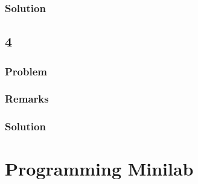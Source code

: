 \documentclass[12pt,twoside]{article}
\begin{document}
\subsubsection*{Solution}

\subsection{4}
\subsubsection*{Problem}
\subsubsection*{Remarks}
\subsubsection*{Solution}

\section{Programming Minilab}
\end{document}
